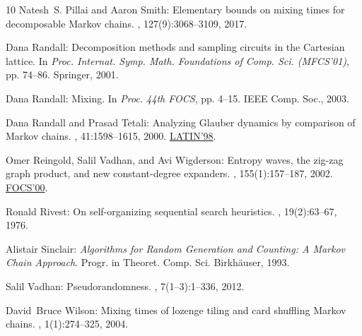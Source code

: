 \documentclass[11pt]{article}
\begin{document}
\begin{thebibliography}{10}
{\sc Natesh~S. Pillai and Aaron Smith}: Elementary bounds on mixing times for
  decomposable {M}arkov chains.
, 127(9):3068--3109, 2017.

{\sc Dana Randall}: Decomposition methods and sampling circuits in the
  {C}artesian lattice.
\newblock In {\em Proc. Internat. Symp. Math. Foundations of Comp. Sci.
  (MFCS'01)}, pp. 74--86. Springer, 2001.
\newblock [\epfmtdoi{10.1007/3-540-44683-4\_8}]

{\sc Dana Randall}: Mixing.
\newblock In {\em Proc. 44th FOCS}, pp. 4--15. IEEE Comp. Soc., 2003.

{\sc Dana Randall and Prasad Tetali}: Analyzing {G}lauber dynamics by
  comparison of {M}arkov chains.
, 41:1598--1615, 2000.
\newblock \prelim \href{https://doi.org/10.1007/BFb0054330}{LATIN'98}.
\newblock [\epfmtdoi{10.1063/1.533199}]

{\sc Omer Reingold, Salil Vadhan, and Avi Wigderson}: Entropy waves, the
  zig-zag graph product, and new constant-degree expanders.
, 155(1):157--187, 2002.
\newblock \prelim \href{https://doi.org/10.1109/SFCS.2000.892006}{FOCS'00}.
\newblock [\epfmtdoi{10.2307/3062153}]

{\sc Ronald Rivest}: On self-organizing sequential search heuristics.
, 19(2):63--67, 1976.
\newblock [\epfmtdoi{10.1145/359997.360000}]

{\sc Alistair Sinclair}: {\em Algorithms for Random Generation and Counting:
  {A} {M}arkov Chain Approach}.
\newblock Progr. in Theoret. Comp. Sci. Birkh\"{a}user, 1993.
\newblock [\epfmtdoi{10.1007/978-1-4612-0323-0}]

{\sc Salil Vadhan}: Pseudorandomness.
, 7(1--3):1--336, 2012.
\newblock [\epfmtdoi{10.1561/0400000010}]

{\sc David~Bruce Wilson}: Mixing times of lozenge tiling and card shuffling
  {M}arkov chains.
, 1(1):274--325, 2004.

\end{thebibliography}
\end{document}
